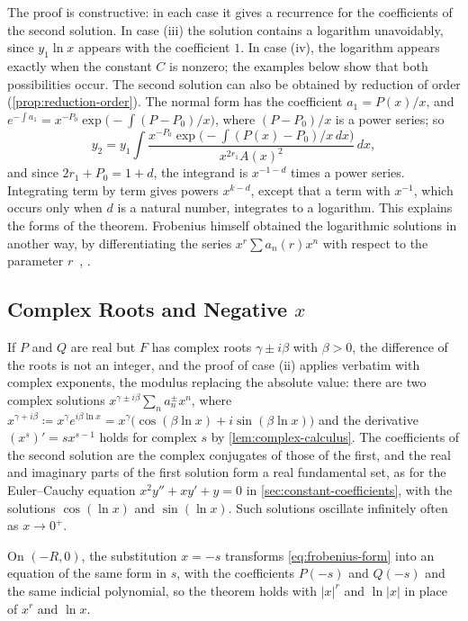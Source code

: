 The proof is constructive: in each case it gives a recurrence for the coefficients of the second solution. In case (iii) the solution contains a logarithm unavoidably, since $y_1\ln x$ appears with the coefficient $1$. In case (iv), the logarithm appears exactly when the constant $C$ is nonzero; the examples below show that both possibilities occur. The second solution can also be obtained by reduction of order (\cref{prop:reduction-order}). The normal form has the coefficient $a_1=P(x)/x$, and $e^{-\int a_1}=x^{-P_0}\exp\bigl(-\int(P-P_0)/x\bigr)$, where $(P-P_0)/x$ is a power series; so
\[
y_2=y_1\int\frac{x^{-P_0}\exp\bigl(-\int(P(x)-P_0)/x\,dx\bigr)}{x^{2r_1}A(x)^2}\,dx ,
\]
and since $2r_1+P_0=1+d$, the integrand is $x^{-1-d}$ times a power series. Integrating term by term gives powers $x^{k-d}$, except that a term with $x^{-1}$, which occurs only when $d$ is a natural number, integrates to a logarithm. This explains the forms of the theorem. Frobenius himself obtained the logarithmic solutions in another way, by differentiating the series $x^r\sum a_n(r)x^n$ with respect to the parameter $r$~\cite{frobenius1873}, \cite[Chap.~XVI]{ince1926}.

\subsection{Complex Roots and Negative \texorpdfstring{$x$}{x}}

If $P$ and $Q$ are real but $F$ has complex roots $\gamma\pm i\beta$ with $\beta>0$, the difference of the roots is not an integer, and the proof of case (ii) applies verbatim with complex exponents, the modulus replacing the absolute value: there are two complex solutions $x^{\gamma\pm i\beta}\sum_na_n^\pm x^n$, where $x^{\gamma+i\beta}\coloneqq x^\gamma e^{i\beta\ln x}=x^\gamma\bigl(\cos(\beta\ln x)+i\sin(\beta\ln x)\bigr)$ and the derivative $(x^{s})'=sx^{s-1}$ holds for complex $s$ by \cref{lem:complex-calculus}. The coefficients of the second solution are the complex conjugates of those of the first, and the real and imaginary parts of the first solution form a real fundamental set, as for the Euler--Cauchy equation $x^2y''+xy'+y=0$ in \cref{sec:constant-coefficients}, with the solutions $\cos(\ln x)$ and $\sin(\ln x)$. Such solutions oscillate infinitely often as $x\to0^+$.

On $(-R,0)$, the substitution $x=-s$ transforms \eqref{eq:frobenius-form} into an equation of the same form in $s$, with the coefficients $P(-s)$ and $Q(-s)$ and the same indicial polynomial, so the theorem holds with $|x|^{r}$ and $\ln|x|$ in place of $x^r$ and $\ln x$.

